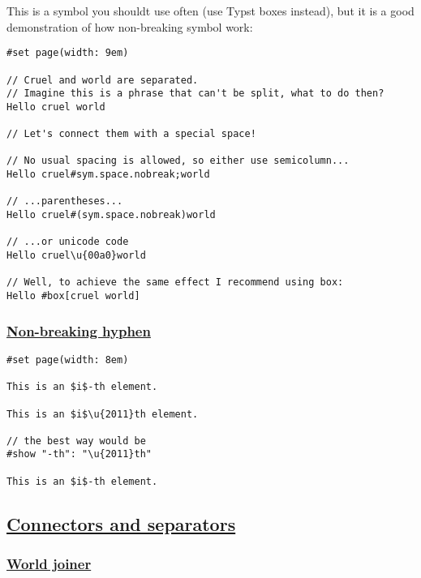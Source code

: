 This is a symbol you should\textquotesingle t use often (use Typst boxes
instead), but it is a good demonstration of how non-breaking symbol
work:

\begin{verbatim}
#set page(width: 9em)

// Cruel and world are separated.
// Imagine this is a phrase that can't be split, what to do then?
Hello cruel world

// Let's connect them with a special space!

// No usual spacing is allowed, so either use semicolumn...
Hello cruel#sym.space.nobreak;world

// ...parentheses...
Hello cruel#(sym.space.nobreak)world

// ...or unicode code
Hello cruel\u{00a0}world

// Well, to achieve the same effect I recommend using box:
Hello #box[cruel world]
\end{verbatim}

\pandocbounded{}

\subsubsection{\texorpdfstring{\hyperref[non-breaking-hyphen]{Non-breaking
hyphen}}{Non-breaking hyphen}}\label{non-breaking-hyphen}

\begin{verbatim}
#set page(width: 8em)

This is an $i$-th element.

This is an $i$\u{2011}th element.

// the best way would be
#show "-th": "\u{2011}th"

This is an $i$-th element.
\end{verbatim}

\pandocbounded{}

\subsection{\texorpdfstring{\hyperref[connectors-and-separators]{Connectors
and
separators}}{Connectors and separators}}\label{connectors-and-separators}

\subsubsection{\texorpdfstring{\hyperref[world-joiner]{World
joiner}}{World joiner}}\label{world-joiner}

